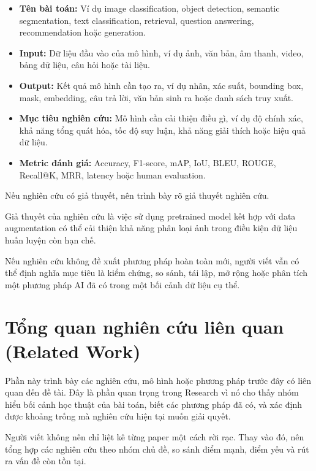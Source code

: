 \documentclass[12pt]{ai_conquer2026}
\begin{document}
\begin{itemize}
\item \textbf{Tên bài toán:} Ví dụ image classification, object detection, semantic segmentation, text classification, retrieval, question answering, recommendation hoặc generation.
\item \textbf{Input:} Dữ liệu đầu vào của mô hình, ví dụ ảnh, văn bản, âm thanh, video, bảng dữ liệu, câu hỏi hoặc tài liệu.
\item \textbf{Output:} Kết quả mô hình cần tạo ra, ví dụ nhãn, xác suất, bounding box, mask, embedding, câu trả lời, văn bản sinh ra hoặc danh sách truy xuất.
\item \textbf{Mục tiêu nghiên cứu:} Mô hình cần cải thiện điều gì, ví dụ độ chính xác, khả năng tổng quát hóa, tốc độ suy luận, khả năng giải thích hoặc hiệu quả dữ liệu.
\item \textbf{Metric đánh giá:} Accuracy, F1-score, mAP, IoU, BLEU, ROUGE, Recall@K, MRR, latency hoặc human evaluation.
\end{itemize}

Nếu nghiên cứu có giả thuyết, nên trình bày rõ giả thuyết nghiên cứu.

\begin{aivncodebox}[Ví dụ:]
Giả thuyết của nghiên cứu là việc sử dụng pretrained model kết hợp với data augmentation có thể cải thiện khả năng phân loại ảnh trong điều kiện dữ liệu huấn luyện còn hạn chế.
\end{aivncodebox}

Nếu nghiên cứu không đề xuất phương pháp hoàn toàn mới, người viết vẫn có thể định nghĩa mục tiêu là kiểm chứng, so sánh, tái lập, mở rộng hoặc phân tích một phương pháp AI đã có trong một bối cảnh dữ liệu cụ thể.

\section{Tổng quan nghiên cứu liên quan (Related Work)}

Phần này trình bày các nghiên cứu, mô hình hoặc phương pháp trước đây có liên quan đến đề tài. Đây là phần quan trọng trong Research vì nó cho thấy nhóm hiểu bối cảnh học thuật của bài toán, biết các phương pháp đã có, và xác định được khoảng trống mà nghiên cứu hiện tại muốn giải quyết.

Người viết không nên chỉ liệt kê từng paper một cách rời rạc. Thay vào đó, nên tổng hợp các nghiên cứu theo nhóm chủ đề, so sánh điểm mạnh, điểm yếu và rút ra vấn đề còn tồn tại.
\end{document}
